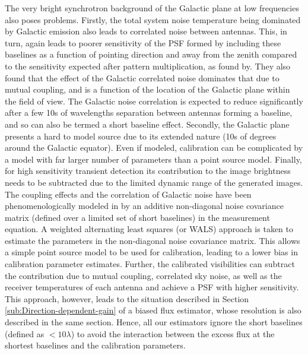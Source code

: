 \documentclass{aa}
\begin{document}
The very bright synchrotron background  of the Galactic plane at low frequencies
also poses problems. Firstly, the total system noise temperature being dominated
by Galactic emission  also leads to correlated noise  between antennas. This, in
turn, again  leads to poorer  sensitivity of the  PSF formed by  including these
baselines as a function of pointing  direction and away from the zenith compared
to   the   sensitivity  expected   after   pattern   multiplication,  as   found
by\citep{ellingson2011sensitivity}.   They also  found  that the  effect of  the
Galactic  correlated noise  dominates  that due  to  mutual coupling,  and is  a
function of  the location of  the Galactic plane  within the field of  view. The
Galactic noise correlation  is expected to reduce significantly  after a few 10s
of wavelengths separation  between antennas forming a baseline,  and so can also
be termed a short baseline effect.
Secondly, the Galactic plane presents a hard to model source due to its extended
nature  (10s  of  degrees  around  the  Galactic  equator).   Even  if  modeled,
calibration can be  complicated by a model with far  larger number of parameters
than a point source model. Finally, for high sensitivity transient detection its
contribution to the  image brightness needs to be subtracted  due to the limited
dynamic range of the generated images.
The  coupling  effects   and  the  correlation  of  Galactic   noise  have  been
phenomenologically   modeled  in   \citep{wijnholds2010self}   by  an   additive
non-diagonal  noise covariance  matrix  (defined  over a  limited  set of  short
baselines) in the measurement equation. A weighted alternating least squares (or
WALS) approach  is taken  to estimate the  parameters in the  non-diagonal noise
covariance  matrix. This  allows a  simple  point source  model to  be used  for
calibration,   leading    to   a    lower   bias   in    calibration   parameter
estimates. Further,  the calibrated  visibilities can subtract  the contribution
due  to  mutual  coupling,  correlated  sky  noise,  as  well  as  the  receiver
temperatures of  each antenna  and achieve a  PSF with higher  sensitivity. This
approach,   however,    leads   to   the   situation    described   in   Section
\ref{sub:Direction-dependent-gain} of a  biased flux estimator, whose resolution
is also  described in the  same section.  Hence,  all our estimators  ignore the
short baselines (defined  as $<10\lambda$) to avoid the  interaction between the
excess flux at the shortest baselines and the calibration parameters.
\end{document}

